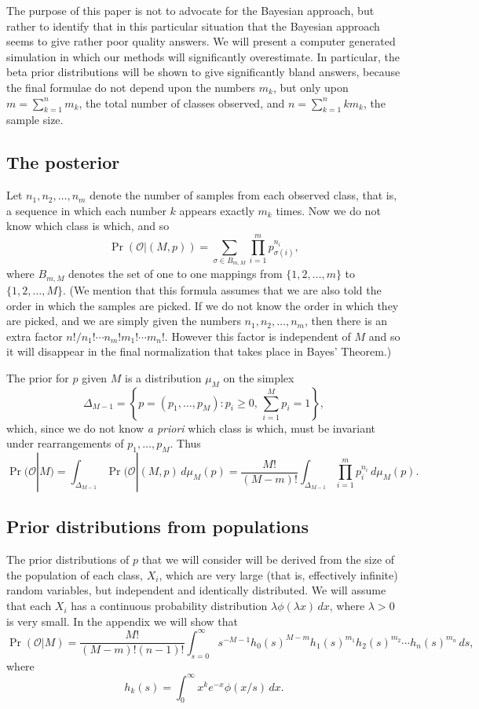 \documentclass{amsart}
\begin{document}
The purpose
of this paper is not to advocate for the Bayesian approach, but rather to
identify that in this particular situation that the Bayesian approach seems
to give rather poor quality answers.  We will present a computer generated
simulation in which our methods will significantly overestimate.  In 
particular,
the beta prior distributions will be shown to give significantly
bland answers, because the final formulae do not depend upon
the numbers $m_k$, but only upon $m = \sum_{k=1}^n m_k$, the total number
of classes observed, and $n = \sum_{k=1}^n k m_k$, the sample
size.

\subsection*{The posterior}  Let $n_1,n_2,\dots,n_m$ denote the number of
samples from each observed class, that is, a sequence in which each
number $k$ appears exactly $m_k$ times.
Now we do not know which class is which, and so
$$ \Pr(\mathcal O | (M,p)) = 
   \sum_{\sigma \in B_{m,M}} \prod_{i=1}^m p_{\sigma(i)}^{n_i} ,$$
where $B_{m,M}$ denotes the set of one to one mappings
from $\{1,2,\dots,m\}$ to $\{1,2,\dots,M\}$.  (We mention
that this formula assumes that we are also told the order in which
the samples are picked.  If we do not know the order in which they are
picked, and we are simply given the numbers $n_1,n_2,\dots,n_m$, then there
is an extra factor $n!/n_1!\cdots n_m!m_1!\cdots m_n!$.  However this factor is independent of $M$ and so it will 
disappear in the final normalization that takes place in Bayes' Theorem.)

The prior for $p$ given $M$ is a distribution $\mu_M$ on the simplex
$$ \Delta_{M-1} = \left \{p = (p_1,\dots,p_M): p_i \ge 0,\, \sum_{i=1}^M p_i = 1 
   \right\} ,$$
which, since we do not know \emph{a priori} which class is which, must be invariant
under rearrangements of $p_1,\dots,p_M$.
Thus
$$ \Pr(\mathcal O|M) =
   \int_{\Delta_{M-1}} \Pr(\mathcal O|(M,p) \, d\mu_M(p) =
   \frac{M!}{(M-m)!} \int_{\Delta_{M-1}} 
   \prod_{i=1}^m p_i^{n_i} \, d\mu_M(p) .$$

\subsection*{Prior distributions from populations}

The prior distributions of $p$ that we will consider will
be derived from the size of the population of each class,
$X_i$, which are very large
(that is, effectively infinite) random variables, but independent and
identically distributed.  We will assume that each $X_i$ has a
continuous probability distribution 
$\lambda \phi(\lambda x)\, dx$, where 
$\lambda>0$ is very small.  In the appendix we will show that
$$
   \Pr(\mathcal O|M) 
   =
   \frac{M!}{(M-m)!(n-1)!}
   \int_{s=0}^\infty s^{-M-1}
   h_0(s)^{M-m} h_1(s)^{m_1} h_2(s)^{m_2} \cdots h_n(s)^{m_n} \, ds ,$$
where
$$ h_k(s) 
   = \int_0^\infty x^k e^{-x} \phi(x/s) \, dx .$$
\end{document}
